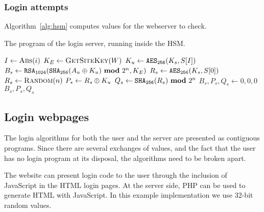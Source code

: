 \subsubsection{Login attempts}
Algorithm~\vref{alg:hsm} computes values for the webserver to check.
\nopagebreak
\begin{algorithm}[H]
\caption{The program of the login server, running inside the HSM.}
\label{alg:hsm}
\begin{algorithmic}[1]
\State $I\gets\Call{Abs}{i}$ 
\State $K_E\gets\Call{GetSiteKey}{W}$ 
\State $K_u\gets\texttt{\ensuremath{\mathtt{AES_{256}}}}(K_s,S[I])$	
\State $B_s\gets\texttt{\ensuremath{\mathtt{RSA_{1024}}}}(\texttt{\ensuremath{\mathtt{SHA_{256}}}}(A_u\oplus K_u)\ \textbf{mod}\ 2^{n},K_E)$ 
\State $R_s\gets\texttt{\ensuremath{\mathtt{AES_{256}}}}(K_s,S[0])$
\Else{}
\State $R_s\gets\Call{Random}{n}$
\EndIf
\State $P_s\gets R_s\oplus K_u$
\State $Q_s\gets\texttt{\ensuremath{\mathtt{SHA_{256}}}}(R_s)\ \textbf{mod}\ 2^{n}$
\Else{}
\State $B_s,P_s,Q_s\gets0,0,0$
\EndIf
\State \Return $B_s, P_s, Q_s$
\EndProcedure
\end{algorithmic}
\end{algorithm}
\subsection{Login webpages}
The login algorithms for both the user and the server are presented as contiguous programs.
Since there are several exchanges of values,
and the fact that the user has no login program at its disposal,
the algorithms need to be broken apart.
\par
The website can present login code to the user through the inclusion of JavaScript in the HTML login pages.
At the server side, PHP can be used to generate HTML with JavaScript.
In this example implementation we use 32-bit random values.
